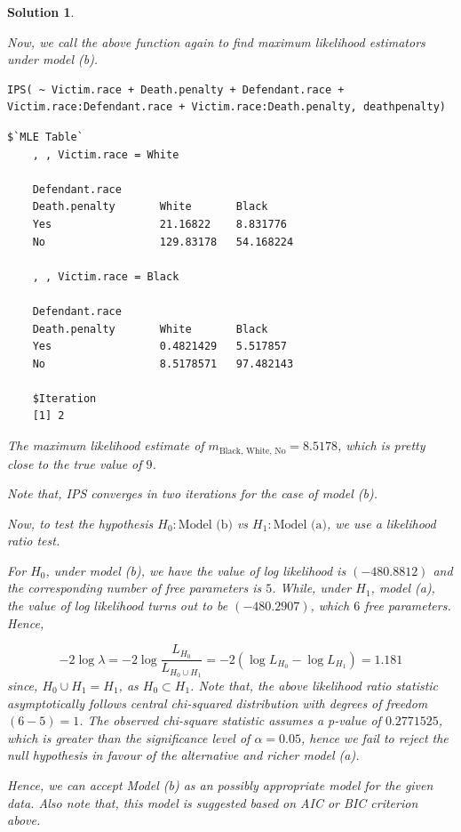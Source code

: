 \documentclass[12pt]{article}
\theoremstyle{problemstyle}
\newtheorem*{solution*}{Solution}
\begin{document}
\begin{solution*}
\begin{enumerate}
	Now, we call the above function again to find maximum likelihood estimators under model (b).
	\begin{lstlisting}[style = R-code]
	IPS( ~ Victim.race + Death.penalty + Defendant.race + Victim.race:Defendant.race + Victim.race:Death.penalty, deathpenalty)
	\end{lstlisting}
	\begin{lstlisting}[style = R-output]
	$`MLE Table`
	, , Victim.race = White
	
	Defendant.race
	Death.penalty     	White     	Black
	Yes  				21.16822  	8.831776
	No  				129.83178 	54.168224
	
	, , Victim.race = Black
	
	Defendant.race
	Death.penalty     	White     	Black
	Yes 				0.4821429  	5.517857
	No  				8.5178571 	97.482143
	
	$Iteration
	[1] 2
	\end{lstlisting}
	The maximum likelihood estimate of $m_{\text{Black, White, No}} = 8.5178$, which is pretty close to the true value of $9$.
	
	Note that, IPS converges in two iterations for the case of model (b). 
	
	Now, to test the hypothesis $H_0: \text{Model (b)}$ vs $H_1: \text{Model (a)}$, we use a likelihood ratio test.
	
	For $H_0$, under model (b), we have the value of log likelihood is $(-480.8812)$ and the corresponding number of free parameters is $5$. While, under $H_1$, model (a), the value of log likelihood turns out to be $(-480.2907)$, which $6$ free parameters. Hence,
	
	$$-2\log\lambda = -2\log\frac{L_{H_0}}{L_{H_0 \cup H_1}} = -2(\log L_{H_0} - \log L_{H_1}) = 1.181$$
	since, $H_0 \cup H_1 = H_1$, as $H_0 \subset H_1$. Note that, the above likelihood ratio statistic asymptotically follows central chi-squared distribution with degrees of freedom $(6-5) = 1$. The observed chi-square statistic assumes a p-value of $0.2771525$, which is greater than the significance level of $\alpha = 0.05$, hence we fail to reject the null hypothesis in favour of the alternative and richer model (a). 
	
	Hence, we can accept Model (b) as an possibly appropriate model for the given data. Also note that, this model is suggested based on AIC or BIC criterion above.
	
	
\end{enumerate}

\end{solution*}
\end{document}
